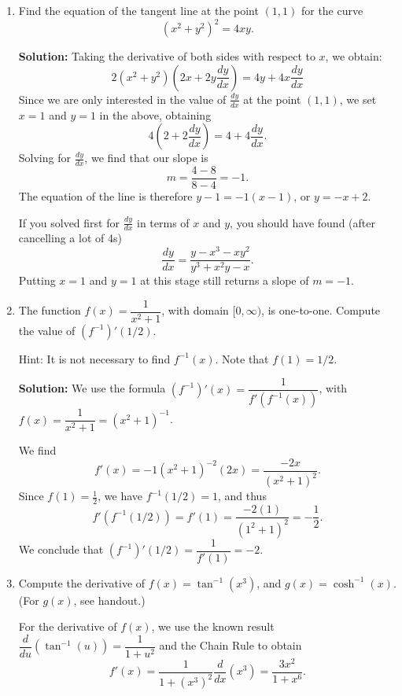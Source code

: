 \documentclass[12pt]{article}
\newcommand{\points}[1]{\marginpar{\hspace{24pt}[#1]}}
\begin{document}
\begin{enumerate}
  \item Find the equation of the tangent line at the point $(1,1)$ for the curve \points{5}
  \[
  (x^2+y^2)^2=4xy.
  \]
 
 \medskip
 
 \textbf{Solution:} Taking the derivative of both sides with respect to $x$, we obtain:
 \[
 2(x^2+y^2)(2x+2y\frac{dy}{dx})=4y+4x\frac{dy}{dx}
 \]
 Since we are only interested in the value of $\frac{dy}{dx}$ at the point $(1,1)$, we set $x=1$ and $y=1$ in the above, obtaining
 \[
 4(2+2\frac{dy}{dx})=4+4\frac{dy}{dx}.
 \]
 Solving for $\frac{dy}{dx}$, we find that our slope is 
 \[
 m=\frac{4-8}{8-4}=-1.
 \]
 The equation of the line is therefore $y-1=-1(x-1)$, or $y=-x+2$.
 
 \medskip
 
 If you solved first for $\frac{dy}{dx}$ in terms of $x$ and $y$, you should have found (after cancelling a lot of 4s)
 \[
 \frac{dy}{dx} = \frac{y-x^3-xy^2}{y^3+x^2y-x}.
 \]
 Putting $x=1$ and $y=1$ at this stage still returns a slope of $m=-1$.
 
 \medskip
 
 
 
 \item The function $f(x)=\dfrac{1}{x^2+1}$, with domain $[0,\infty)$, is one-to-one. \points{2} Compute the value of $(f^{-1})'(1/2)$.
 
 Hint: It is not necessary to find $f^{-1}(x)$. Note that $f(1)=1/2$.
 
\medskip

\textbf{Solution:} We use the formula $(f^{-1})'(x) = \dfrac{1}{f'(f^{-1}(x))}$, with $f(x) = \dfrac{1}{x^2+1} = (x^2+1)^{-1}$.

We find 
\[
f'(x) = -1(x^2+1)^{-2}(2x) = \frac{-2x}{(x^2+1)^2}.
\]
Since $f(1) = \frac{1}{2}$, we have $f^{-1}(1/2)=1$, and thus
\[
f'(f^{-1}(1/2)) = f'(1) = \frac{-2(1)}{(1^2+1)^2} = -\frac{1}{2}.
\]
We conclude that $(f^{-1})'(1/2) = \dfrac{1}{f'(1)} = -2$.

\bigskip
 
 \item Compute the derivative of $f(x) = \tan^{-1}(x^3)$, and $g(x) = \cosh^{-1}(x)$. (For $g(x)$, see handout.) \points{3}
 
 \bigskip
 
 For the derivative of $f(x)$, we use the known result $\dfrac{d}{du}(\tan^{-1}(u)) = \dfrac{1}{1+u^2}$ and the Chain Rule to obtain
 \[
 f'(x) = \frac{1}{1+(x^3)^2}\frac{d}{dx}(x^3) = \frac{3x^2}{1+x^6}.
 \]
 

\end{enumerate}
\end{document}
